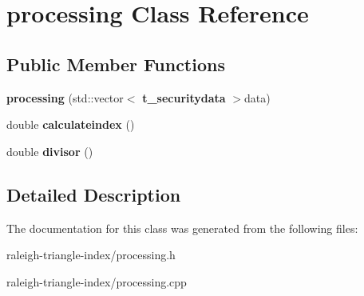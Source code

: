\section{processing Class Reference}
\label{classprocessing}
\subsection*{Public Member Functions}
\begin{DoxyCompactItemize}
\item 
{\bfseries processing} (std\+::vector$<$ {\bf t\+\_\+securitydata} $>$data)\label{classprocessing_a4174503428b065b85cb9216af7099524}

\item 
double {\bfseries calculateindex} ()\label{classprocessing_a1058d79c5ce0e964ac483bf1baa86f1b}

\item 
double {\bfseries divisor} ()\label{classprocessing_a7f73e57a23996d6e76079407e271eb32}

\end{DoxyCompactItemize}


\subsection{Detailed Description}


The documentation for this class was generated from the following files\+:\begin{DoxyCompactItemize}
\item 
raleigh-\/triangle-\/index/processing.\+h\item 
raleigh-\/triangle-\/index/processing.\+cpp\end{DoxyCompactItemize}
